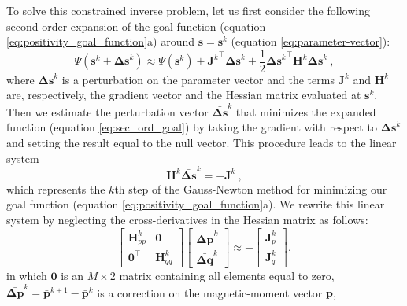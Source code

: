 To solve this constrained inverse problem, let us first consider the following 
second-order expansion of the goal function (equation \ref{eq:positivity_goal_function}a)
around $\mathbf{s} = \mathbf{s}^{k}$ (equation \ref{eq:parameter-vector}):
\begin{equation}
\Psi(\mathbf{s}^{k} + \mathbf{\Delta s}^{k}) \approx \Psi(\mathbf{s}^{k}) + 
{\mathbf{J}^{k}}^{\top} \mathbf{\Delta s}^{k} + 
\frac{1}{2} {\mathbf{\Delta s}^{k}}^{\top} \mathbf{H}^{k} \mathbf{\Delta s}^{k}  \: ,
\label{eq:sec_ord_goal}
\end{equation}
where $\mathbf{\Delta s}^{k}$ is a perturbation on the parameter vector 
and the terms $\mathbf{J}^{k}$ and $\mathbf{H}^{k}$ are, respectively, the gradient vector 
and the Hessian matrix evaluated at $\mathbf{s}^{k}$.
Then we estimate the perturbation vector $\bar{\mathbf{\Delta s}}^k$ that minimizes the 
expanded function (equation \ref{eq:sec_ord_goal}) by taking the gradient with respect 
to $\mathbf{\Delta s}^k$ and setting the result equal to the null vector.
This procedure leads to the linear system
\begin{equation}
\mathbf{H}^{k} \bar{\mathbf{\Delta s}}^{k} = - \mathbf{J}^{k} \: ,
\label{eq:linear_sys_GN}
\end{equation}
which represents the $k$th step of the Gauss-Newton method \citep{aster2005} for minimizing 
our goal function (equation \ref{eq:positivity_goal_function}a).
We rewrite this linear system by neglecting the cross-derivatives in the Hessian matrix 
as follows:
\begin{equation}
\left[
\begin{array}{c|c}
\mathbf{H}_{pp}^{k} & \mathbf{0} \\
\hline
\mathbf{0}^{\top} & \mathbf{H}_{qq}^{k}
\end{array}
\right] \left[ \begin{array}{c}
\bar{\mathbf{\Delta p}}^{k} \\ 
\bar{\mathbf{\Delta q}}^{k} 
\end{array} \right] \approx -\left[ \begin{array}{c}
\mathbf{J}_{p}^{k} \\ 
\mathbf{J}_{q}^{k} 
\end{array} \right] ,
\label{eq:linear_sys_GN_block}
\end{equation}
in which $\mathbf{0}$ is an $M \times 2$ matrix containing all elements equal to zero, 
$\bar{\mathbf{\Delta p}}^{k} = \bar{\mathbf{p}}^{k+1} - \bar{\mathbf{p}}^{k}$ 
is a correction on the magnetic-moment vector $\mathbf{p}$,
